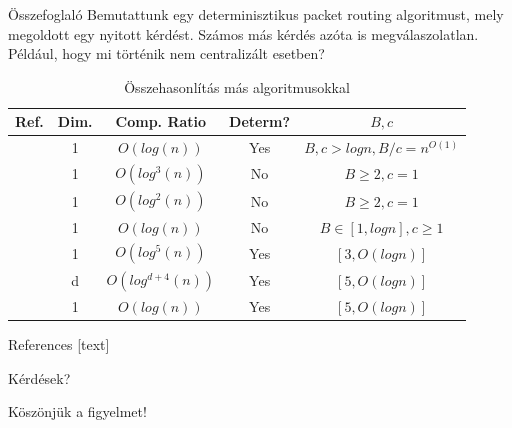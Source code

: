 \documentclass[10pt]{beamer}
\begin{document}
\begin{frame}{Összefoglaló}
  Bemutattunk egy determinisztikus packet routing algoritmust, mely megoldott egy nyitott kérdést. Számos más kérdés azóta is megválaszolatlan. Például, hogy mi történik nem centralizált esetben?
  \begin{table}
  	\begin{tabular}{ c c c c c }
  		\toprule
  		Ref. & Dim. & Comp. Ratio & Determ? & $ B, c $ \\
  		\midrule
  			\cite{even2010logn, even2011online, evenM14} & 1 & $ O(log(n)) $ & Yes & $ B, c > log n, B/c = n^{O(1)} $ \\
  			\cite{angelov2009network} & 1 & $ O(log^3(n)) $ & No & $ B \geq 2, c = 1 $ \\
			\cite{azar2005packet} & 1 & $ O(log^2(n)) $ & No & $ B \geq 2, c = 1 $ \\
			\cite{even2010logn, evenM14} & 1 & $ O(log(n)) $ & No & $ B \in [1, log n], c \geq 1 $ \\
			\cite{even2011online, evenM14} & 1 & $ O(log^5(n)) $ & Yes & $ [3, O(log n)] $ \\
			\cite{even2011online, evenM14} & d & $ O(log^{d+4}(n)) $ & Yes & $ [5, O(log n)] $ \\
			\hline
			\cite{even2015better} & 1 & $ O(log(n)) $ & Yes & $ [5, O(log n)] $ \\
		\bottomrule
	\end{tabular}
	\caption{Összehasonlítás más algoritmusokkal}
  \end{table}
\end{frame}

\appendix

\begin{frame}[allowframebreaks]{References}
	[text]
	
	
	
\end{frame}

\begin{frame}[standout]
  Kérdések?
\end{frame}

\begin{frame}[standout]
	Köszönjük a figyelmet!
\end{frame}
\end{document}
